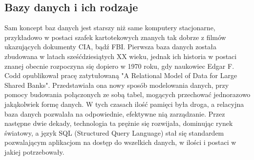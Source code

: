 \documentclass[12pt, a4paper]{article}
\begin{document}
\begin{sloppypar}
{  \subsection{Bazy danych i ich rodzaje}
  {
    Sam koncept baz danych jest starszy niż same komputery stacjonarne, przykładowo w
    postaci szafek kartotekowych znanych tak dobrze z filmów ukazujących dokumenty CIA,
    bądź FBI. Pierwsza baza danych została zbudowana w latach sześćdziesiątych XX wieku,
    jednak ich historia w postaci znanej obecnie rozpoczyna się dopiero w 1970 roku,
    gdy naukowiec Edgar F. Codd opublikował pracę zatytułowaną "A Relational Model of
    Data for Large Shared Banks". Przedstawiała ona nowy sposób modelowania danych,
    przy pomocy budowania połączonych ze sobą tabel, mogących przechować jednorazowo
    jakąkolwiek formę danych. W tych czasach ilość pamięci była droga, a relacyjna baza
    danych pozwalała na odpowiednie, efektywne nią zarządzanie. Przez następne dwie
    dekady, technologia ta prężnie się rozwijała, dominując rynek światowy, a język
    SQL (Structured Query Language) stał się standardem pozwalającym aplikacjom na
    dostęp do wszelkich danych, w ilości i postaci w jakiej potrzebowały.

}}
\end{sloppypar}
\end{document}
